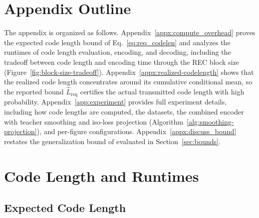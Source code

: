 \documentclass{article}
\theoremstyle{plain}
\theoremstyle{definition}
\theoremstyle{remark}
\begin{document}
\section*{Appendix Outline}
The appendix is organized as follows. Appendix~\ref{appx:compute_overhead} proves the expected code length bound of Eq.~\eqref{eq:req_codelen} and analyzes the runtimes of code length evaluation, encoding, and decoding, including the tradeoff between code length and encoding time through the REC block size (Figure~\ref{fig:block-size-tradeoff}). Appendix~\ref{appx:realized-codelength} shows that the realized code length concentrates around its cumulative conditional mean, so the reported bound $\widehat L_\mathrm{req}$ certifies the actual transmitted code length with high probability. Appendix~\ref{app:experiment} provides full experiment details, including how code lengths are computed, the datasets, the combined encoder with teacher smoothing and iso-loss projection (Algorithm~\ref{alg:smoothing-projection}), and per-figure configurations. Appendix~\ref{appx:discuss_bound} restates the generalization bound of \citet{finzi2025compute} evaluated in Section~\ref{sec:bounds}.
%
\section{Code Length and Runtimes}\label{appx:proof}\label{appx:compute_overhead}
\subsection{Expected Code Length}
\end{document}

